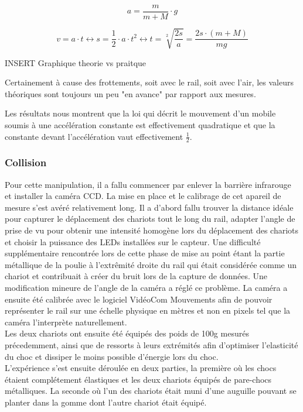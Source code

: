 \begin{equation}
    a = \frac{m}{m + M} \cdot g
\end{equation}

\begin{equation}
    v = a\cdot t \leftrightarrow s=\frac{1}{2}\cdot a \cdot t^2 \leftrightarrow t = \sqrt[2]{\frac{2s}{a}} = \frac{2s\cdot (m + M)}{mg}
\end{equation}

INSERT Graphique theorie vs praitque

Certainement à cause des frottements, soit avec le rail, soit avec l'air, les valeurs théoriques sont toujours un peu "en avance" par rapport aux mesures.

Les résultats nous montrent que la loi qui décrit le mouvement d'un mobile soumis à une accélération constante est effectivement quadratique et que la constante devant l'accélération vaut effectivement $\frac{1}{2}$.

\subsubsection{Collision}
Pour cette manipulation, il a fallu commencer par enlever la barrière infrarouge et installer la caméra CCD.
La mise en place et le calibrage de cet apareil de mesure s'est avéré relativement long. Il a d'abord fallu trouver la distance idéale pour capturer le déplacement des chariots tout le long du rail, adapter l'angle de prise de vu pour obtenir une intensité homogène lors du déplacement des chariots et choisir la puissance des LEDs installées sur le capteur. Une difficulté supplémentaire rencontrée lors de cette phase de mise au point étant la partie métallique de la poulie à l'extrêmité droite du rail qui était considérée comme un chariot et contribuait à créer du bruit lors de la capture de données. Une modification mineure de l'angle de la caméra a réglé ce problème.
La caméra a ensuite été calibrée avec le logiciel VidéoCom Mouvements afin de pouvoir représenter le rail sur une échelle physique en mètres et non en pixels tel que la caméra l'interprète naturellement.\\
Les deux chariots ont ensuite été équipés des poids de 100g mesurés précedemment, ainsi que de ressorts à leurs extrémités afin d'optimiser l'elasticité du choc et dissiper le moins possible d'énergie lors du choc. \\

L'expérience s'est ensuite déroulée en deux parties, la première où les chocs étaient complétement élastiques et les deux chariots équipés de pare-chocs métalliques. La seconde où l'un des chariots était muni d'une auguille pouvant se planter dans la gomme dont l'autre chariot était équipé.

